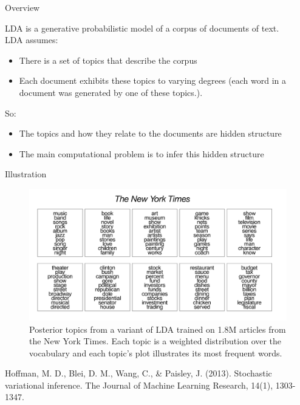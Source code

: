 \documentclass[10pt]{beamer}
\newcommand{\+}[1]{\ensuremath{{\boldsymbol #1}}} %
\begin{document}
\begin{frame}{Overview}

LDA is a generative probabilistic model of a corpus of documents of text.  \\
\vfill
LDA assumes:

\begin{itemize}
\item There is a set of topics that describe the corpus
\item Each document exhibits these topics to varying degrees  (each word in a document was generated by one of these topics.).
\end{itemize}
\vfill
So:
\begin{itemize}
\item The topics and how they relate to the documents are hidden structure
\item The main computational problem is to infer this hidden structure 
\end{itemize}
\end{frame}

\begin{frame}{Illustration}
  
\begin{figure}
\includegraphics[width=\textwidth]{images/lda_topics_nyt}
\caption{ Posterior topics from a variant of LDA trained on 1.8M articles from the New York Times.  Each topic is a weighted distribution over the vocabulary and each topic’s plot illustrates its most frequent words.}
\end{figure}

\vfill

\tiny Hoffman, M. D., Blei, D. M., Wang, C., \& Paisley, J. (2013). Stochastic variational inference. The Journal of Machine Learning Research, 14(1), 1303-1347.
  
\end{frame}
\end{document}
